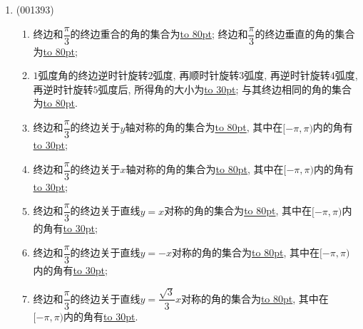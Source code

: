 \documentclass[10pt,a4paper]{article}
\newcommand{\blank}[1]{\underline{\hbox to #1pt{}}}
\begin{document}
\begin{enumerate}[1.]
\begin{enumerate}[(1)]
\item $x$轴的负半轴: 角度制\blank{100}; 弧度制\blank{100};\\ 
\item $y$轴的正半轴: 角度制\blank{100}; 弧度制\blank{100};\\ 
\item $y$轴的负半轴: 角度制\blank{100}; 弧度制\blank{100};\\ 
\item $x$轴: 角度制\blank{100}; 弧度制\blank{100};\\ 
\item $y$轴: 角度制\blank{100}; 弧度制\blank{100};\\ 
\item 坐标轴: 角度制\blank{100}; 弧度制\blank{100};\\ 
\item 坐标轴的角平分线: 角度制\blank{100}; 弧度制\blank{100};\\ 
\item 直线$y=\sqrt{3}x$: 角度制\blank{100}; 弧度制\blank{100}.\\ 
\end{enumerate}
\item {\tiny (001393)}\begin{enumerate}[(1)]
\item 终边和$\dfrac{\pi}{3}$的终边重合的角的集合为\blank{80}; 终边和$\dfrac{\pi}{3}$的终边垂直的角的集合为\blank{80};\\ 
\item $1$弧度角的终边逆时针旋转$2$弧度, 再顺时针旋转$3$弧度, 再逆时针旋转$4$弧度, 再逆时针旋转$5$弧度后, 所得角的大小为\blank{30}; 与其终边相同的角的集合为\blank{80}.\\ 
\item 终边和$\dfrac{\pi}{3}$的终边关于$y$轴对称的角的集合为\blank{80}, 其中在$[-\pi,\pi)$内的角有\blank{30};\\ 
\item 终边和$\dfrac{\pi}{3}$的终边关于$x$轴对称的角的集合为\blank{80}, 其中在$[-\pi,\pi)$内的角有\blank{30};\\ 
\item 终边和$\dfrac{\pi}{3}$的终边关于直线$y=x$对称的角的集合为\blank{80}, 其中在$[-\pi,\pi)$内的角有\blank{30};\\ 
\item 终边和$\dfrac{\pi}{3}$的终边关于直线$y=-x$对称的角的集合为\blank{80}, 其中在$[-\pi,\pi)$内的角有\blank{30};\\ 
\item 终边和$\dfrac{\pi}{3}$的终边关于直线$y=\dfrac{\sqrt{3}}{3}x$对称的角的集合为\blank{80}, 其中在$[-\pi,\pi)$内的角有\blank{30}.\\ 

\end{enumerate}
\end{enumerate}
\end{document}
